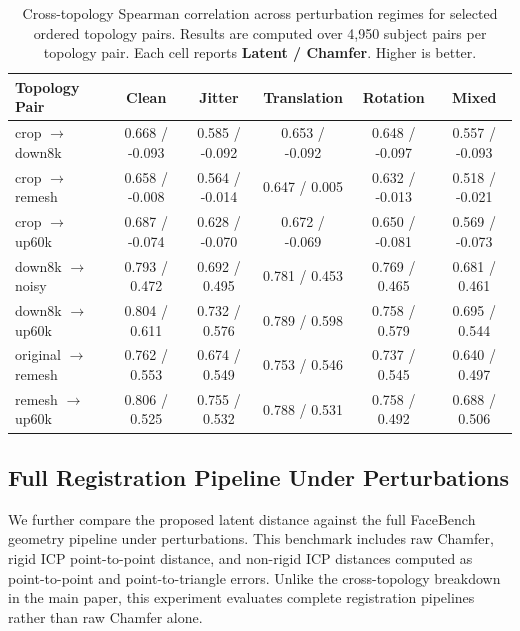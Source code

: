 \documentclass[10pt,twocolumn,letterpaper]{article}
\begin{document}
\begin{table}[h]
\centering
\small
\caption{
Cross-topology Spearman correlation across perturbation regimes for selected
ordered topology pairs. Results are computed over 4,950 subject pairs per
topology pair. Each cell reports \textbf{Latent / Chamfer}. Higher is better.
}
\label{tab:xtopo_latent_chamfer_app}
\begin{tabular}{lccccc}
\toprule
Topology Pair & Clean & Jitter & Translation & Rotation & Mixed \\
\midrule
crop $\rightarrow$ down8k
& 0.668 / -0.093
& 0.585 / -0.092
& 0.653 / -0.092
& 0.648 / -0.097
& 0.557 / -0.093 \\

crop $\rightarrow$ remesh
& 0.658 / -0.008
& 0.564 / -0.014
& 0.647 / 0.005
& 0.632 / -0.013
& 0.518 / -0.021 \\

crop $\rightarrow$ up60k
& 0.687 / -0.074
& 0.628 / -0.070
& 0.672 / -0.069
& 0.650 / -0.081
& 0.569 / -0.073 \\

down8k $\rightarrow$ noisy
& 0.793 / 0.472
& 0.692 / 0.495
& 0.781 / 0.453
& 0.769 / 0.465
& 0.681 / 0.461 \\

down8k $\rightarrow$ up60k
& 0.804 / 0.611
& 0.732 / 0.576
& 0.789 / 0.598
& 0.758 / 0.579
& 0.695 / 0.544 \\

original $\rightarrow$ remesh
& 0.762 / 0.553
& 0.674 / 0.549
& 0.753 / 0.546
& 0.737 / 0.545
& 0.640 / 0.497 \\

remesh $\rightarrow$ up60k
& 0.806 / 0.525
& 0.755 / 0.532
& 0.788 / 0.531
& 0.758 / 0.492
& 0.688 / 0.506 \\
\bottomrule
\end{tabular}
\end{table}

\subsection{Full Registration Pipeline Under Perturbations}
\label{app:facebench_pipeline_perturbations}

We further compare the proposed latent distance against the full FaceBench
geometry pipeline under perturbations. This benchmark includes raw Chamfer,
rigid ICP point-to-point distance, and non-rigid ICP distances computed as
point-to-point and point-to-triangle errors. Unlike the cross-topology breakdown
in the main paper, this experiment evaluates complete registration pipelines
rather than raw Chamfer alone.
\end{document}
